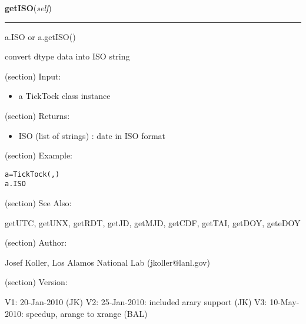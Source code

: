     \label{spacepy:spacetime:TickTock:getISO}

    \vspace{0.5ex}

\hspace{.8\funcindent}\begin{boxedminipage}{\funcwidth}

    \raggedright \textbf{getISO}(\textit{self})

    \vspace{-1.5ex}

    \rule{\textwidth}{0.5\fboxrule}
\setlength{\parskip}{2ex}
    a.ISO or a.getISO()

    convert dtype data into ISO string

    (section) Input:

      \begin{itemize}
      \setlength{\parskip}{0.6ex}
        \item a TickTock class instance

      \end{itemize}

    (section) Returns:

      \begin{itemize}
      \setlength{\parskip}{0.6ex}
        \item ISO (list of strings) : date in ISO format

      \end{itemize}

    (section) Example:

\begin{alltt}
\pysrcprompt{{\textgreater}{\textgreater}{\textgreater} }a = TickTock(, )
\pysrcprompt{{\textgreater}{\textgreater}{\textgreater} }a.ISO
\pysrcoutput{['2002-02-02T12:00:00']}\end{alltt}
    (section) See Also:

      getUTC, getUNX, getRDT, getJD, getMJD, getCDF, getTAI, getDOY, 
      geteDOY

    (section) Author:

      Josef Koller, Los Alamos National Lab (jkoller@lanl.gov)

    (section) Version:

      V1: 20-Jan-2010 (JK) V2: 25-Jan-2010: included arary support (JK) V3:
      10-May-2010: speedup, arange to xrange (BAL)

\setlength{\parskip}{1ex}
    \end{boxedminipage}

